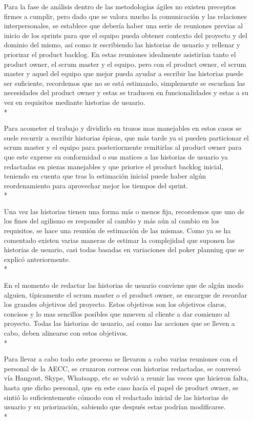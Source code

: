 \documentclass[../pfc.tex]{subfiles}
\begin{document}
	
Para la fase de análisis dentro de las metodologías ágiles no existen preceptos firmes a cumplir, pero dado que se valora mucho la comunicación y las relaciones interpersonales, se establece que debería haber una serie de reuniones previas al inicio de los sprints para que el equipo pueda obtener contexto del proyecto y del dominio del mismo, así como ir escribiendo las historias de usuario y rellenar y priorizar el product backlog. En estas reuniones idealmente asistirían tanto el product owner, el scrum master y el equipo, pero con el product owner, el scrum master y aquel del equipo que mejor pueda ayudar a escribir las historias puede ser suficiente, recordemos que no se está estimando, simplemente se escuchan las necesidades del product owner y estas se traducen en funcionalidades y estas a su vez en requisitos mediante historias de usuario.\\*

Para acometer el trabajo y dividirlo en trozos mas manejables en estos casos se suele recurrir a escribir historias épicas, que más tarde ya si pueden particionar el scrum master y el equipo para posteriormente remitirlas al product owner para que este exprese su conformidad o sus matices a las historias de usuario ya redactadas en piezas manejables y que priorice el product backlog inicial, teniendo en cuenta que tras la estimación inicial puede haber algún reordenamiento para aprovechar mejor los tiempos del sprint.\\* 

Una vez las historias tienen una forma más o menos fija, recordemos que uno de los fines del agilismo es responder al cambio y más aún al cambio en los requisitos, se hace una reunión de estimación de las mismas. Como ya se ha comentado existen varias maneras de estimar la complejidad que suponen las historias de usuario, casi todas basadas en variaciones del poker planning que se explicó anteriormente.\\* 

En el momento de redactar las historias de usuario conviene que de algún modo alguien, típicamente el scrum master o el product owner, se encargue de recordar los grandes objetivos del proyecto. Estos objetivos son los objetivos claros, concisos y lo mas sencillos posibles que mueven al cliente a dar comienzo al proyecto. Todas las historias de usuario, así como las acciones que se lleven a cabo, deben alinearse con estos objetivos.\\*


Para llevar a cabo todo este proceso se llevaron a cabo varias reuniones con el personal de la AECC, se cruzaron correos con historias redactadas, se conversó vía Hangout, Skype, Whatsapp, etc se volvió a reunir las veces que hicieron falta, hasta que dicho personal, que en este caso hacía el papel de product owner,  se sintió lo suficientemente cómodo con el redactado inicial de las historias de usuario y su priorización, sabiendo que después estas podrían modificarse.\\*
	
\end{document}
